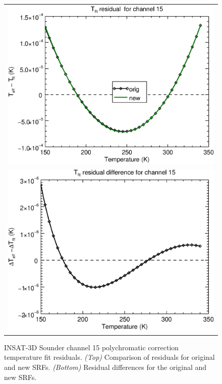 \begin{figure}[H]
  \centering
  \begin{tabular}{c}
    \includegraphics[scale=0.55]{graphics/sndr/tfit/sndr_insat3d-15.tfit.eps} \\
    \includegraphics[scale=0.55]{graphics/sndr/tfit/sndr_insat3d-15.tfit.difference.eps}
  \end{tabular}
  \caption{INSAT-3D Sounder channel 15 polychromatic correction temperature fit residuals. \emph{(Top)} Comparison of residuals for original and new SRFs. \emph{(Bottom)} Residual differences for the original and new SRFs.}
  \label{fig:sndr_ch15_tfit}
\end{figure}


